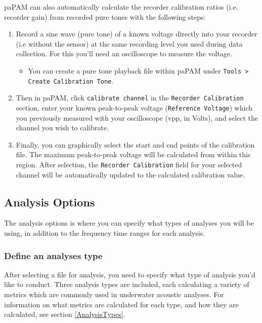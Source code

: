\documentclass[11pt]{report}
\begin{document}
paPAM can also automatically calculate the recorder calibration ratios (i.e. recorder gain) from recorded pure tones with the following steps:
\begin{enumerate}
\item Record a sine wave (pure tone) of a known voltage directly into your recorder (i.e without the sensor) at the same recording level you used during data collection. For this you'll need an oscilloscope to measure the voltage.

\begin{itemize}
\item You can create a pure tone playback file within paPAM under \texttt{Tools > Create Calibration Tone}.
\end{itemize}

\item Then in paPAM, click \texttt{calibrate channel} in the \texttt{Recorder Calibration} section, enter your known peak-to-peak voltage (\texttt{Reference Voltage}) which you previously measured with your oscilloscope (vpp, in Volts), and select the channel you wish to calibrate.

\item Finally, you can graphically select the start and end points of the calibration file.  The maximum peak-to-peak voltage will be calculated from within this region.  After selection, the \texttt{Recorder Calibration} field for your selected channel will be automatically updated to the calculated calibration value.
\end{enumerate}

\subsection{Analysis Options}
The analysis options is where you can specify what types of analyses you will be using, in addition to the frequency time ranges for each analysis.

\subsubsection{Define an analyses type}
After selecting a file for analysis, you need to specify what type of analysis you'd like to conduct.  Three analysis types are included, each calculating a variety of metrics which are commonly used in underwater acoustic analyses.  For information on what metrics are calculated for each type, and how they are calculated, see section \ref{AnalysisTypes}.
\end{document}
